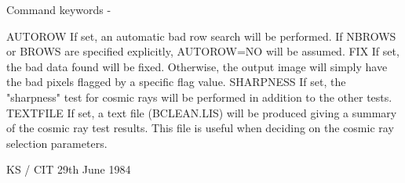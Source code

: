 \begin{description}
\begin{terminalv}
 Command keywords -

 AUTOROW   If set, an automatic bad row search will be performed.
           If NBROWS or BROWS are specified explicitly,
           AUTOROW=NO will be assumed.
 FIX       If set, the bad data found will be fixed.
           Otherwise, the output image will simply have the bad
           pixels flagged by a specific flag value.
 SHARPNESS If set, the "sharpness" test for cosmic rays will
           be performed in addition to the other tests.
 TEXTFILE  If set, a text file (BCLEAN.LIS) will be
           produced giving a summary of the cosmic ray test
           results. This file is useful when deciding on the
           cosmic ray selection parameters.

                                     KS / CIT 29th June 1984
\end{terminalv}
\end{description}
